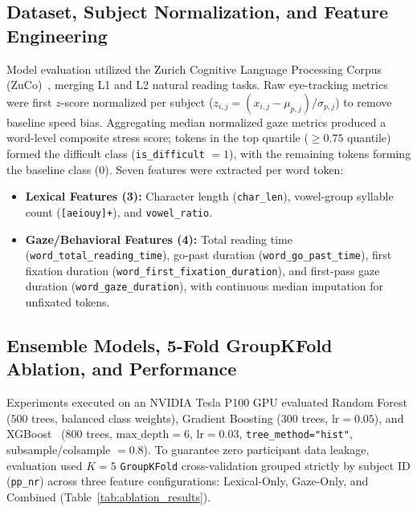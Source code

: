 \documentclass[conference]{IEEEtran}
\begin{document}
\subsection{Dataset, Subject Normalization, and Feature Engineering}
Model evaluation utilized the Zurich Cognitive Language Processing Corpus (ZuCo)~\cite{17}, merging L1 and L2 natural reading tasks. Raw eye-tracking metrics were first $z$-score normalized per subject ($z_{i,j} = (x_{i,j} - \mu_{p,j})/\sigma_{p,j}$) to remove baseline speed bias. Aggregating median normalized gaze metrics produced a word-level composite stress score; tokens in the top quartile ($\ge 0.75$ quantile) formed the difficult class (\texttt{is\_difficult} $= 1$), with the remaining tokens forming the baseline class ($0$). Seven features were extracted per word token:
\begin{itemize}
    \item \textbf{Lexical Features (3):} Character length (\texttt{char\_len}), vowel-group syllable count (\texttt{[aeiouy]+}), and \texttt{vowel\_ratio}.
    \item \textbf{Gaze/Behavioral Features (4):} Total reading time (\texttt{word\_total\_reading\_time}), go-past duration (\texttt{word\_go\_past\_time}), first fixation duration (\texttt{word\_first\_fixation\_duration}), and first-pass gaze duration (\texttt{word\_gaze\_duration}), with continuous median imputation for unfixated tokens.
\end{itemize}

\subsection{Ensemble Models, 5-Fold GroupKFold Ablation, and Performance}
Experiments executed on an NVIDIA Tesla P100 GPU evaluated Random Forest ($500$ trees, balanced class weights), Gradient Boosting ($300$ trees, $\text{lr}=0.05$), and XGBoost~\cite{18} ($800$ trees, $\text{max\_depth}=6$, $\text{lr}=0.03$, \texttt{tree\_method="hist"}, subsample/colsample $=0.8$). To guarantee zero participant data leakage, evaluation used $K=5$ \texttt{GroupKFold} cross-validation grouped strictly by subject ID (\texttt{pp\_nr}) across three feature configurations: Lexical-Only, Gaze-Only, and Combined (Table~\ref{tab:ablation_results}).
\end{document}

